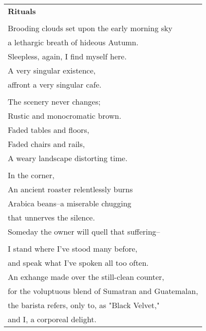 \documentclass{article}
\begin{document}
\newcommand{\h}{\hspace{3ex}}
\newcommand{\hoar}{%
\begin{center}
\line(1,0){350}
\end{center}
}

\begin{center}
\begin{tabular}{l}
\textbf{Rituals} \\
\\
Brooding clouds set upon the early morning sky \\
a lethargic breath of hideous Autumn. \\
Sleepless, again, I find myself here. \\
A very singular existence, \\
affront a very singular cafe. \\
\\
The scenery never changes; \\
Rustic and monocromatic brown. \\
Faded tables and floors, \\
Faded chairs and rails, \\
A weary landscape distorting time. \\
\\
In the corner, \\
An ancient roaster relentlessly burns \\
Arabica beans--a miserable chugging \\
that unnerves the silence. \\
Someday the owner will quell that suffering-- \\
\\
I stand where I've stood many before, \\
and speak what I've spoken all too often. \\
An exhange made over the still-clean counter, \\
for the voluptuous blend of Sumatran and Guatemalan, \\
the barista refers, only to, as "Black Velvet," \\
and I, a corporeal delight. \\
\end{tabular}
\end{center}
\end{document}
